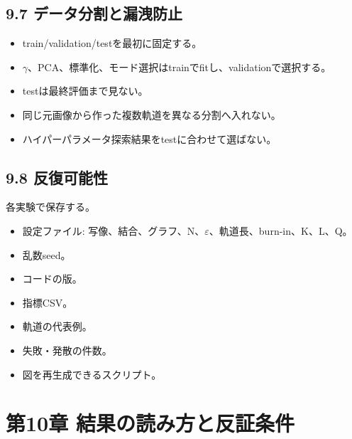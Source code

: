 \documentclass[11pt,a4paper]{ltjsarticle}
\begin{document}
\subsection*{\textcolor{researchblue}{9.7 データ分割と漏洩防止}}

\begin{itemize}

\item train/validation/testを最初に固定する。

\item \(\gamma\)、PCA、標準化、モード選択はtrainでfitし、validationで選択する。

\item testは最終評価まで見ない。

\item 同じ元画像から作った複数軌道を異なる分割へ入れない。

\item ハイパーパラメータ探索結果をtestに合わせて選ばない。

\end{itemize}

\subsection*{\textcolor{researchblue}{9.8 反復可能性}}

各実験で保存する。\par

\begin{itemize}

\item 設定ファイル: 写像、結合、グラフ、N、\(\varepsilon\)、軌道長、burn-in、K、L、Q。

\item 乱数seed。

\item コードの版。

\item 指標CSV。

\item 軌道の代表例。

\item 失敗・発散の件数。

\item 図を再生成できるスクリプト。

\end{itemize}

\goodbreak

\section*{\textcolor{researchink}{第10章 結果の読み方と反証条件}}
\end{document}
